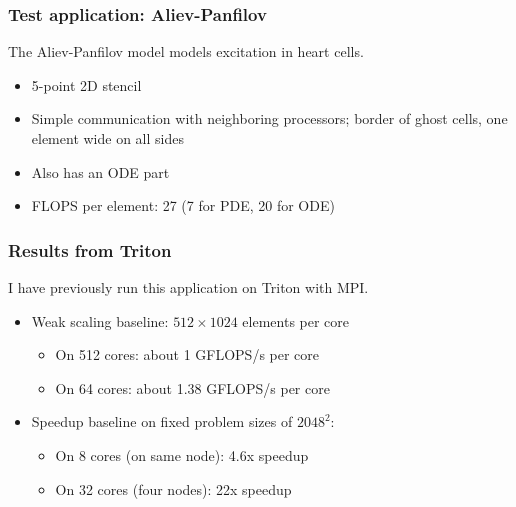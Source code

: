 \documentclass{beamer}
\begin{document}
\begin{frame}
\frametitle{Test application: Aliev-Panfilov}
The Aliev-Panfilov model models excitation in heart cells.
\pause
\begin{itemize}
\item 5-point 2D stencil
\pause
\item Simple communication with neighboring processors; border of ghost cells, one element wide on all sides
\pause
\item Also has an ODE part
\pause
\item FLOPS per element: 27 (7 for PDE, 20 for ODE)
\end{itemize}
\end{frame}

\begin{frame}
\frametitle{Results from Triton}
I have previously run this application on Triton with MPI.
\pause
\begin{itemize}
\item Weak scaling baseline: $512\times 1024$ elements per core
\begin{itemize}
\item On 512 cores: about 1 GFLOPS/s per core
\pause
\item On 64 cores: about 1.38 GFLOPS/s per core
\end{itemize}
\pause
\item Speedup baseline on fixed problem sizes of $2048^2$: 
\begin{itemize}
    \item On 8 cores (on same node): 4.6x speedup
    \pause
    \item On 32 cores (four nodes): 22x speedup
\end{itemize}
\end{itemize}
\end{frame}
\end{document}

